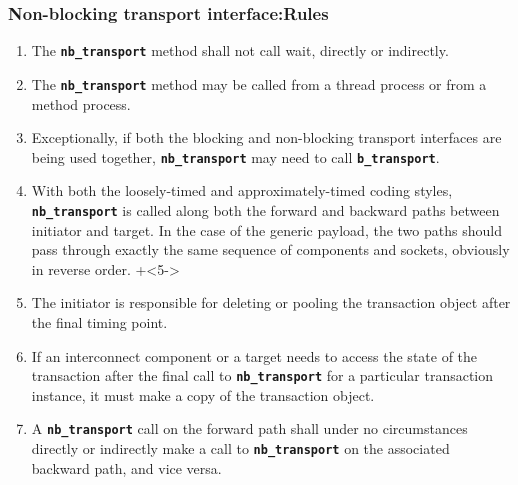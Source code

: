 {\begin{frame}
	\frametitle{Non-blocking transport interface:\newline Rules}
	\begin{enumerate}
		\item The \texttt{\textbf{nb\_transport}} method shall not call wait, directly or indirectly.
		\item The \texttt{\textbf{nb\_transport}} method may be called from a thread process or from a method process.
		\item Exceptionally, if both the blocking and non-blocking transport interfaces are being used together, \texttt{\textbf{nb\_transport}} may need to call \texttt{\textbf{b\_transport}}. 
		\item With both the loosely-timed and approximately-timed coding styles, \texttt{\textbf{nb\_transport}} is called along both the forward and backward paths between initiator and target. 
		In the case of the generic payload, the two paths should pass through exactly the same sequence of components and sockets, obviously in reverse order.
		\vspace{-7cm}
		\onslide+<5->
		\item The initiator is responsible for deleting or pooling the transaction object after the final timing point. 
		\item If an interconnect component or a target needs to access the state of the transaction after the final call to \texttt{\textbf{nb\_transport}} for a particular transaction instance, it must make a copy of the transaction object.
		\item A \texttt{\textbf{nb\_transport}} call on the forward path shall under no circumstances directly or indirectly make a call to \texttt{\textbf{nb\_transport}} on the associated backward path, and vice versa.
	\end{enumerate}
\end{frame}

}
